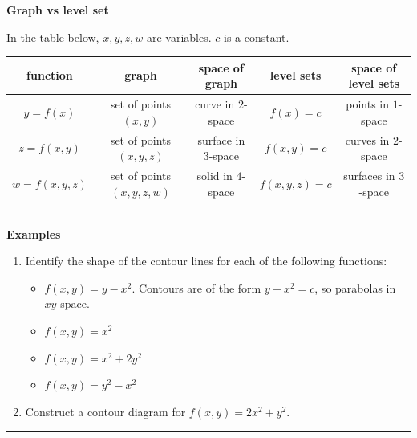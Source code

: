 \documentclass[12pt,letterpaper,noanswers]{exam}
\begin{document}
\noindent\textbf{Graph vs level set}

In the table below, $x,y,z,w$ are variables.  $c$ is a constant.

\begin{tabular}{|c|c|c|c|c|}
\hline
function & graph & space of graph & level sets & space of level sets\\
\hline
  $y=f(x)$   & set of points $(x,y)$ & curve in $2$-space & $f(x) = c$ & points  in $1$-space\\
   $z=f(x,y)$  & set of points $(x,y,z)$ & surface in $3$-space & $f(x,y) = c$ & curves  in $2$-space\\
   $w=f(x,y,z)$  & set of points $(x,y,z,w)$ & solid in $4$-space & $f(x,y,z)=c$ & surfaces in $3$-space \\
   \hline
\end{tabular}

\vspace{0.2cm}
\hrule
\vspace{0.2cm}

\noindent\textbf{Examples}
\begin{enumerate}
    \item Identify the shape of the contour lines for each of the following functions: 
\begin{itemize}
    \item $f(x,y) = y - x^2$.  Contours are of the form $y - x^2 = c$, so parabolas in $xy$-space.
    \item $f(x,y) = x^2$
    \vspace{0.7cm}
    
    \item $f(x,y) = x^2+2y^2$
       \vspace{0.7cm}
       
    \item $f(x,y) = y^2 - x^2$
       \vspace{0.7cm}
       
\end{itemize}
 



\item  Construct a contour diagram for $f(x,y) = 2x^2 + y^2.$


\end{enumerate}



\vspace{0.2cm}
\hrule
\vspace{0.2cm}
\end{document}
